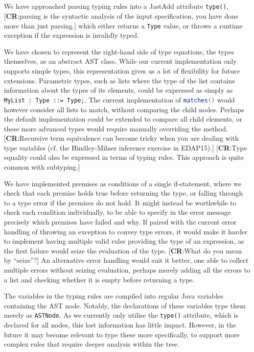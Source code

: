\documentclass[nofilelist]{cslthse-msc}
\newcommand{\CR}[1]{\textcolor{green!60!black}{[\textbf{CR}:#1]}}
\begin{document}
\subsection{\rqtwo}
We have approached parsing typing rules into a JastAdd attribute \verb|type()|,
\CR{parsing is the syntactic analysis of the input specification, you have done more than just parsing.}
which either returns a \verb|Type| value, or throws a runtime exception if the expression is invalidly typed.

We have chosen to represent the right-hand side of type equations, the types themselves, as an abstract AST class.
While our current implementation only supports simple types, this representation gives us a lot of flexibility for future extensions.
Parametric types, such as lists where the type of the list contains information about the types of its elements, could be expressed as simply as \lstinline{MyList : Type ::= Type;}.
The current implementation of \lstinline[language=java]{matches()} would however consider all lists to match, without comparing the child nodes.
Perhaps the default implementation could be extended to compare all child elements, or these more advanced types would require manually overriding the method.
\CR{Recursive term equivalence can become tricky when you are dealing with type variables (cf. the Hindley-Milner inference exercise in EDAP15).}
\CR{Type equality could also be expressed in terms of typing rules.  This approach is quite common with subtyping.}

We have implemented premises as conditions of a single if-statement, where we check that each premise holds true before returning the type, or falling through to a type error if the premises do not hold.
It might instead be worthwhile to check each condition individually, to be able to specify in the error message precisely which premises have failed and why.
If paired with the current error handling of throwing an exception to convey type errors, it would make it harder to implement having multiple valid rules providing the type of an expression, as the first failure would seize the evaluation of the type.
\CR{What do you mean by ``seize''?}
An alternative error handling would suit it better, one able to collect multiple errors without seizing evaluation, perhaps merely adding all the errors to a list and checking whether it is empty before returning a type.

The variables in the typing rules are compiled into regular Java variables containing the AST node.
Notably, the declarations of these variables type them merely as \verb|ASTNode|.
As we currently only utilise the \lstinline{type()} attribute, which is declared for all nodes, this lost information has little impact.
However, in the future it may become relevant to type these more specifically, to support more complex rules that require deeper analysis within the tree.
\end{document}
